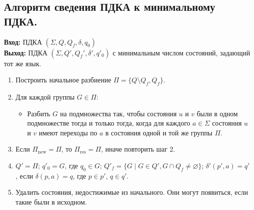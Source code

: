 \documentclass[11pt]{article}
\begin{document}
\subsection{Алгоритм сведения ПДКА к минимальному ПДКА.} 
\textbf{Вход:} ПДКА $(\Sigma, Q, Q_f, \delta, q_0)$ \\
\textbf{Выход:} ПДКА $(\Sigma, Q', Q_f', \delta', q'_0)$ с минимальным числом состояний, задающий тот же язык.
\begin{enumerate}
    \item Построить начальное разбиение $\Pi = \{Q \setminus Q_f, Q_f\}$.
    \item Для каждой группы $G \in \Pi$:
    \begin{itemize}
        \item Разбить $G$ на подмножества так, чтобы состояния $u$ и $v$ были в одном подмножестве тогда и только тогда, когда для каждого $a \in \Sigma$ состояния $u$ и $v$ имеют переходы по $a$ в состояния одной и той же группы $\Pi$.
    \end{itemize}
    \item Если $\Pi_{\text{new}} = \Pi$, то $\Pi_{\text{res}} = \Pi$, иначе повторить шаг 2.
    \item $Q' = \Pi$; $q'_0 = G$, где $q_0 \in G$; $Q'_f = \{G \; | \; G \in Q', G \cap Q_f \neq \varnothing\}$; $\delta'(p', a) = q'$, если $\delta(p, a) = q$, где $p \in p'$, $q \in q'$.
    \item Удалить состояния, недостижимые из начального. Они могут появиться, если такие были в исходном.
\end{enumerate}
\end{document}
